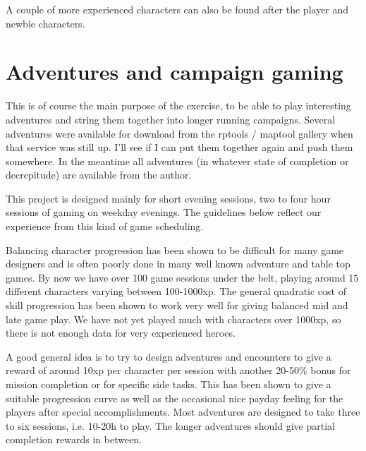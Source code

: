 A couple of more experienced characters can also be found after the player and newbie characters.











\section*{Adventures and campaign gaming}
This is of course the main purpose of the exercise, to be able to play interesting adventures and string them together into longer running campaigns. Several adventures were available for download from the rptools / maptool gallery when that service was still up. I'll see if I can put them together again and push them somewhere. In the meantime all adventures (in whatever state of completion or decrepitude) are available from the author.

This project is designed mainly for short evening sessions, two to four hour sessions of gaming on weekday evenings. The guidelines below reflect our experience from this kind of game scheduling.

Balancing character progression has been shown to be difficult for many game designers and is often poorly done in many well known adventure and table top games. By now we have over 100 game sessions under the belt, playing around 15 different characters varying between 100-1000xp. The general quadratic cost of skill progression has been shown to work very well for giving balanced mid and late game play. We have not yet played much with characters over 1000xp, so there is not enough data for very experienced heroes.

A good general idea is to try to design adventures and encounters to give a reward of around 10xp per character per session with another 20-50\% bonus for mission completion or for specific side tasks. This has been shown to give a suitable progression curve as well as the occasional nice payday feeling for the players after special accomplishments.
Most adventures are designed to take three to six sessions, i.e. 10-20h to play. The longer adventures should give partial completion rewards in between.

